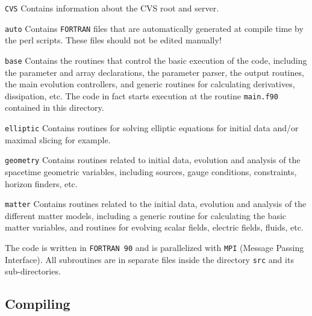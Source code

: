 \documentclass[12pt]{article}
\begin{document}
\begin{list}{}{
\setlength{\leftmargin}{40mm}
\setlength{\labelsep}{10mm}
\setlength{\labelwidth}{25mm}}

\item[\texttt{CVS}] Contains information about the CVS root and server.

\item[\texttt{auto}] Contains \texttt{FORTRAN} files that are
  automatically generated at compile time by the perl scripts.  These
  files should not be edited manually!

\item[\texttt{base}] Contains the routines that control the basic
  execution of the code, including the parameter and array
  declarations, the parameter parser, the output routines, the main
  evolution controllers, and generic routines for calculating
  derivatives, dissipation, etc.  The code in fact starts execution at
  the routine \texttt{main.f90} contained in this directory.

\item[\texttt{elliptic}] Contains routines for solving elliptic
  equations for initial data and/or maximal slicing for example.

\item[\texttt{geometry}] Contains routines related to initial data,
  evolution and analysis of the spacetime geometric variables,
  including sources, gauge conditions, constraints, horizon finders,
  etc.

\item[\texttt{matter}] Contains routines related to the initial data,
  evolution and analysis of the different matter models, including a
  generic routine for calculating the basic matter variables, and
  routines for evolving scalar fields, electric fields, fluids, etc.

\end{list}

\vspace{3mm}



The code is written in \texttt{FORTRAN 90} and is parallelized with
\texttt{MPI} (Message Passing Interface).  All subroutines are in
separate files inside the directory \texttt{src} and its
sub-directories.

\subsection{Compiling}
\label{sec:compiling}
\end{document}
